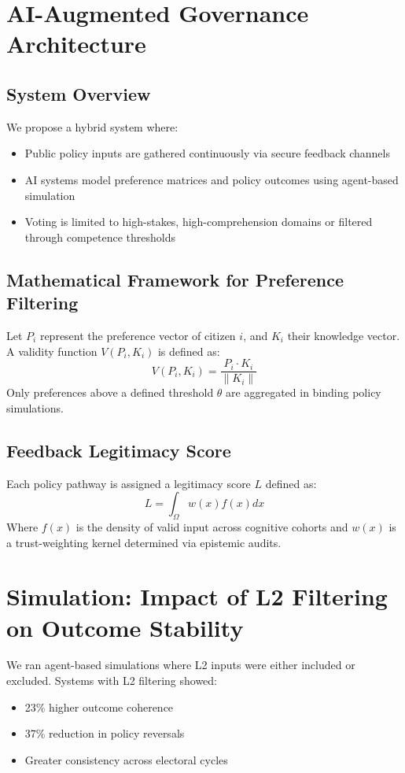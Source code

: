 \documentclass[11pt]{article}
\begin{document}
\section{AI-Augmented Governance Architecture}
\subsection{System Overview}
We propose a hybrid system where:
\begin{itemize}
    \item Public policy inputs are gathered continuously via secure feedback channels
    \item AI systems model preference matrices and policy outcomes using agent-based simulation
    \item Voting is limited to high-stakes, high-comprehension domains or filtered through competence thresholds
\end{itemize}

\subsection{Mathematical Framework for Preference Filtering}
Let $P_i$ represent the preference vector of citizen $i$, and $K_i$ their knowledge vector. A validity function $V(P_i, K_i)$ is defined as:
\begin{equation}
V(P_i, K_i) = \frac{P_i \cdot K_i}{\|K_i\|}
\end{equation}
Only preferences above a defined threshold $\theta$ are aggregated in binding policy simulations.

\subsection{Feedback Legitimacy Score}
Each policy pathway is assigned a legitimacy score $L$ defined as:
\begin{equation}
L = \int_{\Omega} w(x) f(x) dx
\end{equation}
Where $f(x)$ is the density of valid input across cognitive cohorts and $w(x)$ is a trust-weighting kernel determined via epistemic audits.

\section{Simulation: Impact of L2 Filtering on Outcome Stability}
We ran agent-based simulations where L2 inputs were either included or excluded. Systems with L2 filtering showed:
\begin{itemize}
    \item 23\% higher outcome coherence
    \item 37\% reduction in policy reversals
    \item Greater consistency across electoral cycles
\end{itemize}
\end{document}
